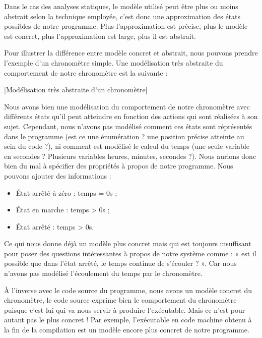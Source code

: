 \documentclass[middle]{zmdocument}
\begin{document}
Dans le cas des analyses statiques, le modèle utilisé peut être plus ou moins 
abstrait selon la technique employée, c'est donc une approximation des états 
possibles de notre programme. Plus l'approximation est précise, plus le modèle est
concret, plus l'approximation est large, plus il est abstrait.



Pour illustrer la différence entre modèle concret et abstrait, nous pouvons 
prendre l'exemple d'un chronomètre simple. Une modélisation très abstraite du
comportement de notre chronomètre est la suivante :



[Modélisation très abstraite d'un chronomètre]


Nous avons bien une modélisation du comportement de notre chronomètre avec 
différents états qu'il peut atteindre en fonction des actions qui sont réalisées
à son sujet. Cependant, nous n'avons pas modélisé comment ces états sont 
réprésentés dans le programme (est ce une énumération ? une position précise 
atteinte au sein du code ?), ni comment est modélisé le calcul du temps (une seule
variable en secondes ? Plusieurs variables heures, minutes, secondes ?). Nous 
aurions donc bien du mal à spécifier des propriétés à propos de notre programme. 
Nous pouvons ajouter des informations :



\begin{itemize}
\item État arrêté à zéro : temps = 0s ;
\item État en marche : temps > 0s ;
\item État arrêté : temps > 0s.
\end{itemize}


Ce qui nous donne déjà un modèle plus concret mais qui est toujours insuffisant 
pour poser des questions intéressantes à propos de notre système comme : « est il 
possible que dans l'état arrêté, le temps continue de s'écouler ? ». Car nous
n'avons pas modélisé l'écoulement du temps par le chronomètre.



À l'inverse avec le code source du programme, nous avons un modèle concret du
chronomètre, le code source exprime bien le comportement du chronomètre puisque
c'est lui qui va nous servir à produire l'exécutable. Mais ce n'est pour autant
pas le plus concret ! Par exemple, l'exécutable en code machine obtenu à la fin
de la compilation est un modèle encore plus concret de notre programme.
\end{document}

